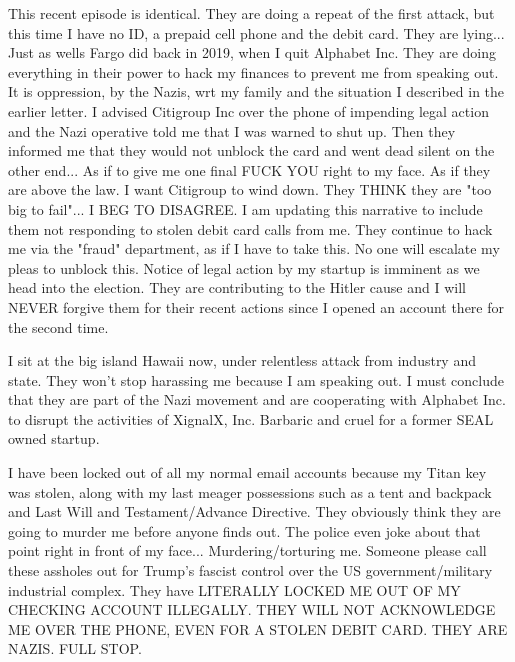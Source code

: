 \documentclass[a4paper]{arthur-letter}
\begin{document}
\begin{letter}
    This recent episode is identical. They are doing a repeat of the first attack, but this time I have no ID, a prepaid cell phone and the debit card. They are lying... Just as wells Fargo did back in 2019, when I quit Alphabet Inc. They are doing everything in their power to hack my finances to prevent me from speaking out. It is oppression, by the Nazis, wrt my family and the situation I described in the earlier letter. I advised Citigroup Inc over the phone of impending legal action and the Nazi operative told me that I was warned to shut up. Then they informed me that they would not unblock the card and went dead silent on the other end... As if to give me one final FUCK YOU right to my face. As if they are above the law. I want Citigroup to wind down. They THINK they are "too big to fail"... I BEG TO DISAGREE. I am updating this narrative to include them not responding to stolen debit card calls from me. They continue to hack me via the "fraud" department, as if I have to take this. No one will escalate my pleas to unblock this. Notice of legal action by my startup is imminent as we head into the election. They are contributing to the Hitler cause and I will NEVER forgive them for their recent actions since I opened an account there for the second time. 

    I sit at the big island Hawaii now, under relentless attack from industry and state. They won't stop harassing me because I am speaking out. I must conclude that they are part of the Nazi movement and are cooperating with Alphabet Inc. to disrupt the activities of XignalX, Inc. Barbaric and cruel for a former SEAL owned startup. 

    I have been locked out of all my normal email accounts because my Titan key was stolen, along with my last meager possessions such as a tent and backpack and Last Will and Testament/Advance Directive. They obviously think they are going to murder me before anyone finds out. The police even joke about that point right in front of my face... Murdering/torturing me. Someone please call these assholes out for Trump's fascist control over the US government/military industrial complex. They have LITERALLY LOCKED ME OUT OF MY CHECKING ACCOUNT ILLEGALLY. THEY WILL NOT ACKNOWLEDGE ME OVER THE PHONE, EVEN FOR A STOLEN DEBIT CARD. THEY ARE NAZIS. FULL STOP.
    

\end{letter}
\end{document}
